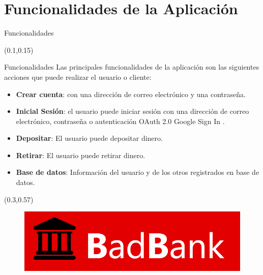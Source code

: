 \documentclass[xcolor=pdftex,dvipsnames,table]{beamer}
\begin{document}
\section{Funcionalidades de la Aplicación}
\begin{frame}{Funcionalidades}
    \begin{textblock*}{0.9\textwidth}(0.1\textwidth,0.15\textwidth)
            \begin{block}{Funcionalidades} 
            \justifying
                Las principales funcionalidades de la aplicación son las siguientes acciones que puede realizar el usuario o cliente:
                    \vspace{-0.0cm}
                    \footnotesize {
                    \begin{itemize}
                      \setlength\itemsep{0.1em}
                        \item {\textbf{Crear cuenta}: con una dirección de correo electrónico y una contraseña.}
                        \item {\textbf{Inicial Sesión}: el usuario puede iniciar sesión con una dirección de correo electrónico, contraseña o autenticación OAuth 2.0 Google Sign In  .}
                        \item {\textbf{Depositar}: El usuario puede depositar dinero.}
                        \item {\textbf{Retirar}: El usuario puede retirar dinero.}
                        \item {\textbf{Base de datos}: Información del usuario y de los otros registrados en base de datos.}
                    \end{itemize}}
            \end{block}
    \end{textblock*}
    
    
    \begin{textblock*}{0.5\textwidth}(0.3\textwidth,0.57\textwidth)
        \begin{figure}
            \centering
            \includegraphics[width=0.9\linewidth]{func/logobadbank.png}
            \label{fig:my_label}
        \end{figure}
    \end{textblock*}
\end{frame}
\end{document}
